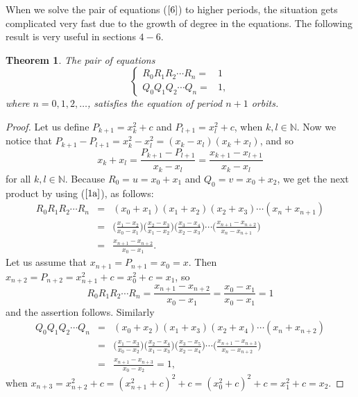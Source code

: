 \documentclass[12pt,a4paper]{amsart}
\newtheorem{lause}{Theorem}
\numberwithin{equation}{section}
\numberwithin{lause}{section}
\begin{document}
When we solve the pair of equations ($\ref{6}$) to higher periods, the situation gets complicated very fast due to the growth of degree in the equations. The following result is very useful in sections $4-6$.
 \begin{lause}
 The pair of equations
\begin{equation}
\left\{\begin{array}{ll}
      R_{0}R_{1}R_{2} \cdots R_{n}=&1\\
      Q_{0}Q_{1}Q_{2} \cdots Q_{n}=&1,\label{uviterkaava}
\end{array}\right.
\end{equation}
where $n=0,1,2,\ldots$, satisfies the equation of period $n+1$ orbits.
\end{lause}
\begin{proof}
Let us define $P_{k+1}=x_{k}^{2}+c$ and $P_{l+1}=x_{l}^{2}+c$, when $k,l \in \mathbb{N}$. Now we notice that $P_{k+1}-P_{l+1}=x_{k}^{2}-x_{l}^{2}=(x_{k}-x_{l})(x_{k}+x_{l})$, and so
\begin{equation}
x_{k}+x_{l}=\frac{P_{k+1}-P_{l+1}}{x_{k}-x_{l}}=\frac{x_{k+1}-x_{l+1}}{x_{k}-x_{l}} \label{1a}
\end{equation}
for all $k, l \in \mathbb{N}$. Because $R_{0}=u=x_{0}+x_{1}$ and $Q_{0}=v=x_{0}+x_{2}$, we get the next product by using ($\ref{1a}$), as follows:
\begin{eqnarray*}
R_{0}R_{1}R_{2} \cdots R_{n}&=&(x_{0}+x_{1})(x_{1}+x_{2})(x_{2}+x_{3})\cdots(x_{n}+x_{n+1})\\
&=&\Big(\frac{x_{1}-x_{2}}{x_{0}-x_{1}}\Big)\Big(\frac{x_{2}-x_{3}}{x_{1}-x_{2}}\Big)\Big(\frac{x_{3}-x_{4}}{x_{2}-x_{3}}\Big)\cdots\Big(\frac{x_{n+1}-x_{n+2}}{x_{n}-x_{n+1}}\Big)\\
&=&\frac{x_{n+1}-x_{n+2}}{x_{0}-x_{1}}.
\end{eqnarray*}
Let us assume that $x_{n+1}=P_{n+1}=x_{0}=x$. Then $x_{n+2}=P_{n+2}=x_{n+1}^{2}+c=x_{0}^{2}+c=x_{1}$, so
\begin{displaymath}
R_{0}R_{1}R_{2} \cdots R_{n}=\frac{x_{n+1}-x_{n+2}}{x_{0}-x_{1}}=\frac{x_{0}-x_{1}}{x_{0}-x_{1}}=1
\end{displaymath}
and the assertion follows.
Similarly
\begin{eqnarray*}
Q_{0}Q_{1}Q_{2} \cdots Q_{n}&=&(x_{0}+x_{2})(x_{1}+x_{3})(x_{2}+x_{4})\cdots(x_{n}+x_{n+2})\\
&=&\Big(\frac{x_{1}-x_{3}}{x_{0}-x_{2}}\Big)\Big(\frac{x_{2}-x_{4}}{x_{1}-x_{3}}\Big)\Big(\frac{x_{3}-x_{5}}{x_{2}-x_{4}}\Big)\cdots\Big(\frac{x_{n+1}-x_{n+3}}{x_{n}-x_{n+2}}\Big)\\
&=&\frac{x_{n+1}-x_{n+3}}{x_{0}-x_{2}}=1,
\end{eqnarray*}
when $x_{n+3}=x_{n+2}^{2}+c=(x_{n+1}^{2}+c)^{2}+c=(x_{0}^{2}+c)^{2}+c=x_{1}^{2}+c=x_{2}$.
\end{proof}
\end{document}
